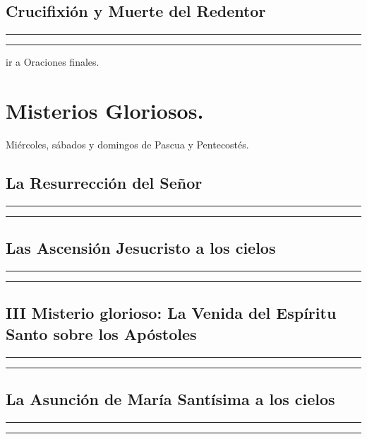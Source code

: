 \documentclass[11pt,a4paper]{book}
\begin{document}
    \subsection{Crucifixión y Muerte del Redentor}
    
    
    \rule{\textwidth}{0.5pt}
    
    \rule{\textwidth}{0.5pt}
    

    ir a Oraciones finales.

    \newpage

    \section{Misterios Gloriosos.}
    Miércoles, sábados y domingos de Pascua y Pentecostés.

    \subsection{La Resurrección del Señor}
    
    
    \rule{\textwidth}{0.5pt}
    
    \rule{\textwidth}{0.5pt}
    

    \subsection{Las Ascensión Jesucristo a los cielos}
    
    
    \rule{\textwidth}{0.5pt}
    
    \rule{\textwidth}{0.5pt}
    

    \subsection{III Misterio glorioso: La Venida del Espíritu Santo sobre los Apóstoles}
    
    
    \rule{\textwidth}{0.5pt}
    
    \rule{\textwidth}{0.5pt}
    

    \subsection{La Asunción de María Santísima a los cielos}
    
    
    \rule{\textwidth}{0.5pt}
    
    \rule{\textwidth}{0.5pt}
    
\end{document}
